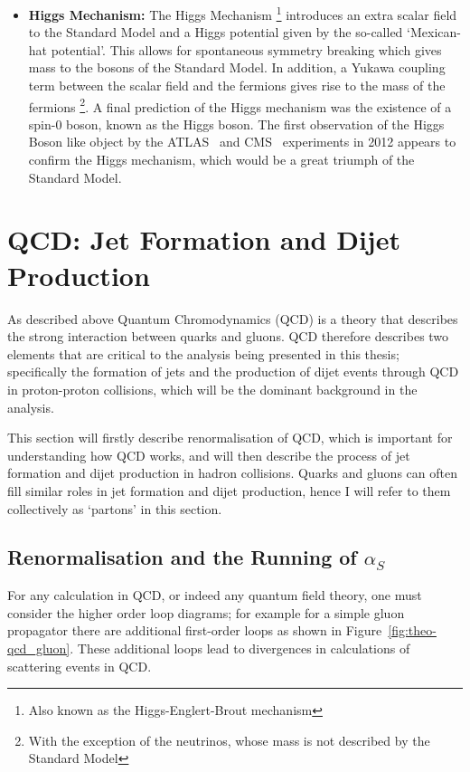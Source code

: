 \begin{itemize}[leftmargin=*]
\item\textbf{Higgs Mechanism:}
  The Higgs Mechanism \footnote{Also known as the Higgs-Englert-Brout mechanism}
  introduces an extra scalar field to the Standard Model
  and a Higgs potential given by the so-called `Mexican-hat potential'.
  This allows for spontaneous symmetry breaking which gives mass to the bosons of the Standard Model.
  In addition, a Yukawa coupling term between the scalar field and the fermions gives rise to the mass of the fermions
  \footnote{With the exception of the neutrinos, whose mass is not described by the Standard Model}.
  A final prediction of the Higgs mechanism was the existence of a spin-0 boson, known as the Higgs boson.
  The first observation of the Higgs Boson like object by the ATLAS~\cite{theo-higgs_atlas} and CMS~\cite{theo-higgs_cms} experiments
  in 2012 appears to confirm the Higgs mechanism, which would be a great triumph of the Standard Model.
\end{itemize}

\section{QCD: Jet Formation and Dijet Production}
\label{theo-qcd}

As described above Quantum Chromodynamics (QCD) is a theory that describes the strong interaction between
quarks and gluons.
QCD therefore describes two elements that are critical to the analysis being presented in this thesis;
specifically the formation of jets and the production of dijet events through QCD in proton-proton collisions,
which will be the dominant background in the analysis.

This section will firstly describe renormalisation of QCD, which is important for understanding how QCD works,
and will then describe the process of jet formation and dijet production in hadron collisions.
Quarks and gluons can often fill similar roles in jet formation and dijet production, hence I will refer to them collectively as `partons' in this section.

\subsection{Renormalisation and the Running of $\alpha_S$}
\label{sec:theo-qcd_dijet_running}

For any calculation in QCD, or indeed any quantum field theory, one must consider the higher order loop diagrams;
for example for a simple gluon propagator there are additional first-order loops as shown in Figure~\ref{fig:theo-qcd_gluon}.
These additional loops lead to divergences in calculations of scattering events in QCD.

